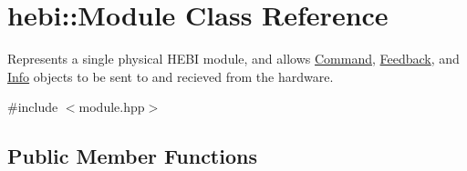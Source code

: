 \hypertarget{classhebi_1_1Module}{}\section{hebi\+:\+:Module Class Reference}
\label{classhebi_1_1Module}


Represents a single physical H\+E\+BI module, and allows \hyperlink{classhebi_1_1Command}{Command}, \hyperlink{classhebi_1_1Feedback}{Feedback}, and \hyperlink{classhebi_1_1Info}{Info} objects to be sent to and recieved from the hardware.  




{\ttfamily \#include $<$module.\+hpp$>$}

\subsection*{Public Member Functions}
